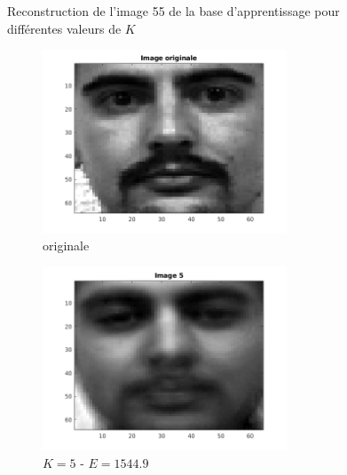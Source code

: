 \documentclass[a4paper]{article}
\begin{document}
\begin{figure}[H]
    \caption{Reconstruction de l'image 55 de la base d'apprentissage pour
    différentes valeurs de $K$} 
    \label{fig:ex3-x55}
\end{figure}

\begin{figure}[H]
    \centering
     
    \begin{subfigure}[c]{0.3\textwidth}
        \centering
        \includegraphics[width=0.8\textwidth]{images/ex3_17_originale.png}
        \caption{originale}
        \label{subfig:ex3_17_originale}
    \end{subfigure}
    \begin{subfigure}[c]{0.3\textwidth}
        \centering
        \includegraphics[width=0.8\textwidth]{images/ex3_17_5.png}
        \caption{$K=5$ - $E = 1544.9$}
        \label{subfig:ex3_17_5}
    \end{subfigure}
    \begin{subfigure}[c]{0.3\textwidth}
        \centering

\end{subfigure}
\end{figure}
\end{document}
